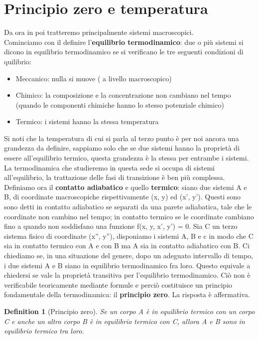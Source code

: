 \documentclass[10pt,a4paper]{article}
\newtheorem{definition}{Definition}
\begin{document}
\section{Principio zero e temperatura}
Da ora in poi tratteremo principalmente sistemi macroscopici.\\
Cominciamo con il definire l'\textbf{equilibrio termodinamico}: due o più sistemi si dicono in equilibrio termodinamico se si verificano le tre seguenti condizioni di quilibrio:
\begin{itemize}
	\item Meccanico: nulla si muove ( a livello macroscopico)
	\item Chimico: la composizione e la concentrazione non cambiano nel tempo (quando le componenti chimiche hanno lo stesso potenziale chimico)
	\item Termico: i sistemi hanno la stessa temperatura
\end{itemize}	
Si noti che la temperatura di cui si parla al terzo punto è per noi ancora una grandezza da definire, sappiamo solo che se due sistemi hanno la proprietà di essere all'equilibrio termico, questa grandezza è la stessa per entrambe i sistemi. La termodinamica che studieremo in questa sede si occupa di sistemi all'equilibrio, la trattazione delle fasi di transizione è ben più complessa.\\
Definiamo ora il \textbf{contatto adiabatico} e quello \textbf{termico}: siano due sistemi A e B, di coordinate macroscopiche rispettivamente (x, y) ed (x', y'). Questi sono sono detti in contatto adiabatico se separati da una parete adiabatica, tale che le coordinate non cambino nel tempo; in contatto termico se le coordinate cambiano fino a quando non soddisfano una funzione f(x, y, x', y') = 0. Sia C un terzo sistema fisico di coordinate (x'', y''), disponiamo i sistemi A, B e c in modo che C sia in contatto termico con A e con B ma A sia in contatto adiabatico con B. Ci chiediamo se, in una situazione del genere, dopo un adeguato intervallo di tempo, i due sistemi A e B siano in equilibrio termodinamico fra loro. Questo equivale a chiedersi se vale la proprietà transitiva per l'equilibrio termodinamico. Ciò non è verificabile teoricamente mediante formule e perciò costituisce un principio fondamentale della termodinamica: il \textbf{principio zero}. La risposta è affermativa.
\begin{definition}[Principio zero]
Se un corpo A è in equilibrio termico con un corpo C e anche un altro corpo B è in equilibrio termico con C, allora A e B sono in equilibrio termico tra loro.
\end{definition}
\end{document}
